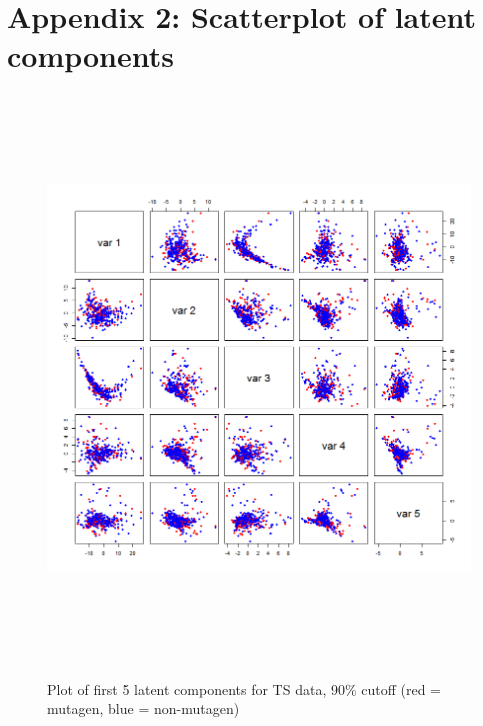 \documentclass[11pt]{llncs}
\begin{document}
\newpage\section*{Appendix 2: Scatterplot of latent components}
\begin{figure}[H]
\begin{center}
   \includegraphics[height=15cm]{pcplot.png}
   \label{fig:fig1}
   \caption{Plot of first 5 latent components for TS data, 90\% cutoff (red = mutagen, blue = non-mutagen)}
\end{center}
\end{figure}
\end{document}
